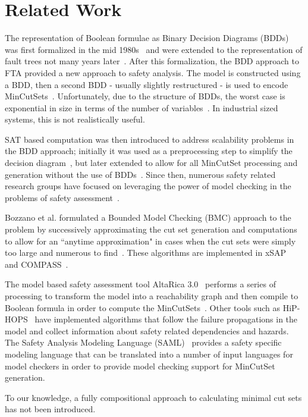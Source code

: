 \section{Related Work}
\label{sec:related_work}
The representation of Boolean formulae as Binary Decision Diagrams (BDDs) was first formalized in the mid 1980s~\cite{bryant1986graph} and were extended to the representation of fault trees not many years later~\cite{rauzy1993new}. After this formalization, the BDD approach to FTA provided a new approach to safety analysis. The model is constructed using a BDD, then a second BDD - usually slightly restructured - is used to encode MinCutSets~\cite{rauzy2008binary}. Unfortunately, due to the structure of BDDs, the worst case is exponential in size in terms of the number of variables~\cite{bryant1986graph,rauzy1993new,rauzy2008binary}. In industrial sized systems, this is not realistically useful. 

SAT based computation was then introduced to address scalability problems in the BDD approach; initially it was used as a preprocessing step to simplify the decision diagram~\cite{bozzano2015safety}, but later extended to allow for all MinCutSet processing and generation without the use of BDDs~\cite{bozzano2015efficient}. Since then, numerous safety related research groups have focused on leveraging the power of model checking in the problems of safety assessment~\cite{bieber2002combination,schafer2003combining,bozzano2007symbolic,bozzano2003improving,volk2017fast,Joshi05:SafeComp,bozzano2015efficient,stewart2020safety}. 

Bozzano et al. formulated a Bounded Model Checking (BMC) approach to the problem by successively approximating the cut set generation and computations to allow for an ``anytime approximation" in cases when the cut sets were simply too large and numerous to find~\cite{bozzano2015efficient,mattarei2016scalable}. These algorithms are implemented in xSAP~\cite{DBLP:conf/tacas/BittnerBCCGGMMZ16} and COMPASS~\cite{compass30toolset}. 

The model based safety assessment tool AltaRica 3.0~\cite{prosvirnova:tel-01119730} performs a series of processing to transform the model into a reachability graph and then compile to Boolean formula in order to compute the MinCutSets~\cite{prosvirnova2015automated}. Other tools such as HiP-HOPS~\cite{papadopoulos2001model} have implemented algorithms that follow the failure propagations in the model and collect information about safety related dependencies and hazards. The Safety Analysis Modeling Language (SAML)~\cite{Gudemann:2010:FQQ:1909626.1909813} provides a safety specific modeling language that can be translated into a number of input languages for model checkers in order to provide model checking support for MinCutSet generation.

To our knowledge, a fully compositional approach to calculating minimal cut sets has not been introduced.



















